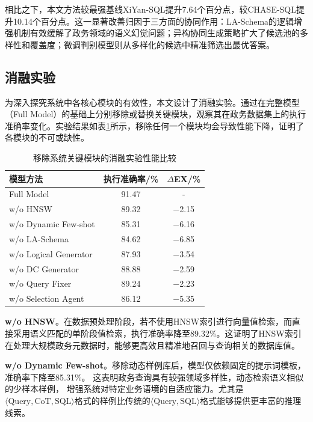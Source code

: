 相比之下，本文方法较最强基线XiYan-SQL提升7.64个百分点，较CHASE-SQL提升10.14个百分点。这一显著改善归因于三方面的协同作用：LA-Schema的逻辑增强机制有效缓解了政务领域的语义幻觉问题；异构协同生成策略扩大了候选池的多样性和覆盖度；微调判别模型则从多样化的候选中精准筛选出最优答案。

\subsection{消融实验}

为深入探究系统中各核心模块的有效性，本文设计了消融实验。通过在完整模型（Full Model）的基础上分别移除或替换关键模块，观察其在政务数据集上的执行准确率变化。实验结果如表\ref{tab:ablation}所示，移除任何一个模块均会导致性能下降，证明了各模块的不可或缺性。

\begin{table}[!htbp]
	\setlength{\abovecaptionskip}{5pt}
	\setlength{\belowcaptionskip}{5pt}
	\caption{移除系统关键模块的消融实验性能比较}
	\label{tab:ablation}
	\centering
	\begin{tabular}{lcc}
		\toprule
		模型方法 & 执行准确率/\% & $\Delta$EX/\% \\
		\midrule
		Full Model & 91.47 & - \\
		\midrule
		w/o HNSW & 89.32 & $-$2.15 \\
		w/o Dynamic Few-shot & 85.31 & $-$6.16 \\
		w/o LA-Schema & 84.62 & $-$6.85 \\
		w/o Logical Generator & 87.93 & $-$3.54 \\
		w/o DC Generator & 88.88 & $-$2.59 \\
		w/o Query Fixer & 89.24 & $-$2.23 \\
		w/o Selection Agent & 86.12 & $-$5.35 \\
		\bottomrule
	\end{tabular}
\end{table}

\textbf{w/o HNSW}。在数据预处理阶段，若不使用HNSW索引进行向量值检索，而直接采用语义匹配的单阶段值检索，执行准确率降至89.32\%。这证明了HNSW索引在处理大规模政务元数据时，能够更高效且精准地召回与查询相关的数据库值。

\textbf{w/o Dynamic Few-shot}。移除动态样例库后，模型仅依赖固定的提示词模板，准确率下降至85.31\%。
这表明政务查询具有较强领域多样性，动态检索语义相似的少样本样例，
增强系统对特定业务语境的自适应能力。尤其是$\langle \text{Query}, \text{CoT}, \text{SQL} \rangle$格式的样例比传统的$\langle \text{Query}, \text{SQL} \rangle$格式能够提供更丰富的推理线索。

